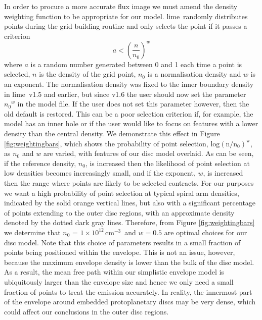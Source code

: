 \documentclass[fleqn,usenatbib]{mnras}
\newcommand{\nzero}{$n_0$ = $1\times10^{12}\,\mathrm{cm^{-3}}$}
\newcommand{\lime}{{\sc lime}}
\begin{document}
In order to procure a more accurate flux image we must amend the density weighting function to be appropriate for our model. \lime\ randomly distributes points during the grid building routine and only selects the point if it passes a criterion
\begin{equation}
    a < \left({\frac{n}{n_0}}\right)^w
\end{equation}
where $a$ is a random number generated between 0 and 1 each time a point is selected, $n$ is the density of the grid point, $n_0$ is a normalisation density and $w$ is an exponent. The normalisation density was fixed to the inner boundary density in \lime\ v1.5 and earlier, but since v1.6 the user should now set the parameter ${n_{0}}^{w}$ in the model file. If the user does not set this parameter however, then the old default is restored. This can be a poor selection criterion if, for example, the model has an inner hole or if the user would like to focus on features with a lower density than the central density. We demonstrate this effect in Figure \ref{fig:weightingbars}, which shows the probability of point selection, $\mathrm{log(n/n_0)^w}$, as $n_0$ and $w$ are varied, with features of our disc model overlaid. As can be seen, if the reference density, $n_0$, is increased then the likelihood of point selection at low densities becomes increasingly small, and if the exponent, $w$, is increased then the range where points are likely to be selected contracts. For our purposes we want a high probability of point selection at typical spiral arm densities, indicated by the solid orange vertical lines, but also with a significant percentage of points extending to the outer disc regions, with an approximate density denoted by the dotted dark gray lines. Therefore, from Figure \ref{fig:weightingbars} we determine that \nzero\ and $w = 0.5$ are optimal choices for our disc model. Note that this choice of parameters results in a small fraction of points being positioned within the envelope. This is not an issue, however, because the maximum envelope density is lower than the bulk of the disc model. As a result, the mean free path within our simplistic envelope model is ubiquitously larger than the envelope size and hence we only need a small fraction of points to treat the emission accurately. In reality, the innermost part of the envelope around embedded protoplanetary discs may be very dense, which could affect our conclusions in the outer disc regions.

\smallskip
\end{document}
